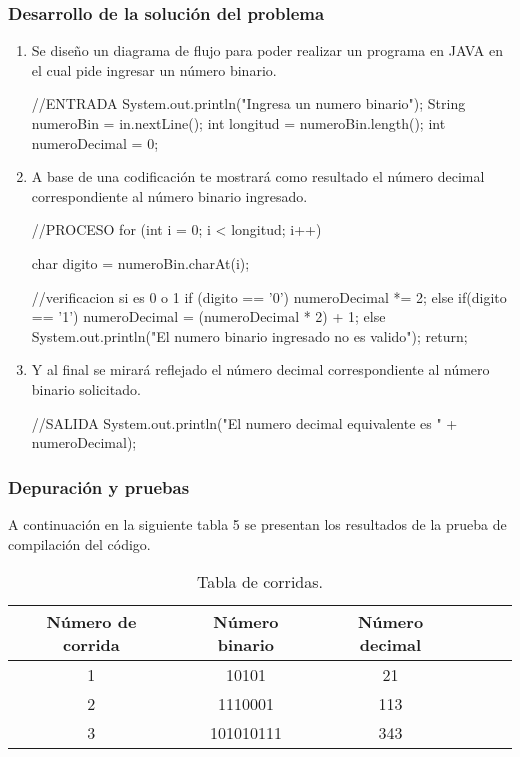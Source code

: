 \subsubsection{Desarrollo de la solución del problema}

\begin{enumerate}
    \item Se diseño un diagrama de flujo para poder realizar un programa en JAVA en el cual pide ingresar un número binario.
    \begin{javaCode}
     //ENTRADA
     System.out.println("Ingresa un numero binario");
            String numeroBin = in.nextLine();
            int longitud = numeroBin.length();
            int numeroDecimal = 0;
    \end{javaCode}
    \item A base de una codificación te mostrará como resultado el número decimal correspondiente al número binario ingresado.
     \begin{javaCode}
     //PROCESO
     for (int i = 0; i < longitud; i++) {
                
                char digito = numeroBin.charAt(i);
                
                //verificacion si es 0 o 1
                if (digito == '0') {
                    numeroDecimal *= 2;
                } else if(digito == '1') {
                    numeroDecimal = (numeroDecimal * 2) + 1;
                } else {
                    System.out.println("El numero binario ingresado no es valido");
                    return;
                }
            }
            
     \end{javaCode}
    \item Y al final se mirará reflejado el número decimal correspondiente al número binario solicitado.
    \begin{javaCode}
    //SALIDA
        System.out.println("El numero decimal equivalente es " + numeroDecimal);
    \end{javaCode}
 \end{enumerate}
\subsubsection{Depuración y pruebas}
A continuación en la siguiente tabla 5 se presentan los resultados de la prueba de compilación del código.

\begin{table}[!ht]
\label{T:equipos}
\begin{center}
\begin{tabular}{| c | c | c | c | c | c |}
\hline
\textbf{Número de corrida} & \textbf{Número binario} & \textbf{Número decimal}\\
\hline
1 & 10101 & 21 \\
2 & 1110001 & 113 \\
3 & 101010111 & 343 \\
\hline
\end{tabular}
\caption{Tabla de corridas.}
\end{center}
\end{table}\\


